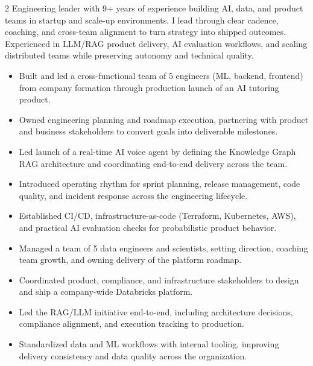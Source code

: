 \documentclass[10pt,a4paper,ragged2e,withhyper]{altacv}
\begin{document}
\begin{paracol}{2}
Engineering leader with 9+ years of experience building AI, data, and product teams in startup and scale-up environments. I lead through clear cadence, coaching, and cross-team alignment to turn strategy into shipped outcomes. Experienced in LLM/RAG product delivery, AI evaluation workflows, and scaling distributed teams while preserving autonomy and technical quality.

\begin{itemize}
    \item Built and led a cross-functional team of 5 engineers (ML, backend, frontend) from company formation through production launch of an AI tutoring product.
    \item Owned engineering planning and roadmap execution, partnering with product and business stakeholders to convert goals into deliverable milestones.
    \item Led launch of a real-time AI voice agent by defining the Knowledge Graph RAG architecture and coordinating end-to-end delivery across the team.
    \item Introduced operating rhythm for sprint planning, release management, code quality, and incident response across the engineering lifecycle.
    \item Established CI/CD, infrastructure-as-code (Terraform, Kubernetes, AWS), and practical AI evaluation checks for probabilistic product behavior.
\end{itemize}
\divider
{}
\begin{itemize}
    \item Managed a team of 5 data engineers and scientists, setting direction, coaching team growth, and owning delivery of the platform roadmap.
    \item Coordinated product, compliance, and infrastructure stakeholders to design and ship a company-wide Databricks platform.
    \item Led the RAG/LLM initiative end-to-end, including architecture decisions, compliance alignment, and execution tracking to production.
    \item Standardized data and ML workflows with internal tooling, improving delivery consistency and data quality across the organization.

\end{itemize}
\end{paracol}
\end{document}
